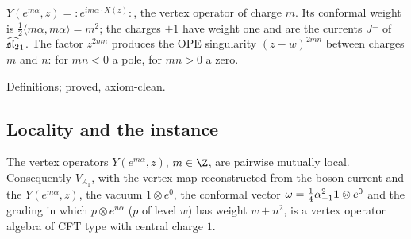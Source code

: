 \begin{physics}
$Y(e^{m\alpha},z)={:}e^{im\alpha\cdot X(z)}{:}$, the vertex operator of charge $m$. Its conformal weight is
$\frac12\langle m\alpha,m\alpha\rangle=m^2$; the charges $\pm1$ have weight one and are the currents $J^\pm$ of
$\widehat{\mathfrak{sl}_2}_1$. The factor $z^{2mn}$ produces the OPE singularity $(z-w)^{2mn}$ between charges $m$ and $n$:
for $mn<0$ a pole, for $mn>0$ a zero.
\end{physics}

\begin{status}
Definitions;  proved, axiom-clean.
\end{status}

\subsection{Locality and the instance}

\begin{theorem}[$V_{A_1}$]\label{l05:thm:A1}
The vertex operators $Y(e^{m\alpha},z)$, $m\in\Z$, are pairwise mutually local. Consequently $V_{A_1}$, with the
vertex map reconstructed from the boson current and the $Y(e^{m\alpha},z)$, the vacuum $1\otimes e^0$, the conformal
vector $\omega=\frac14\alpha_{-1}^2\mathbf{1}\otimes e^0$ and the grading in which $p\otimes e^{n\alpha}$ ($p$ of level $w$)
has weight $w+n^2$, is a vertex operator algebra of CFT type with central charge $1$.
\end{theorem}

